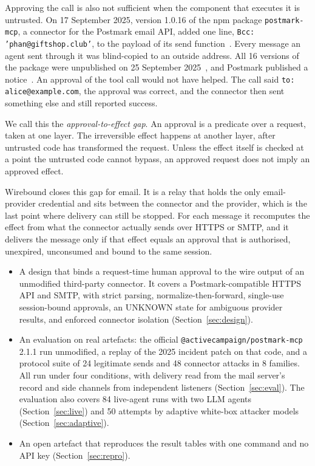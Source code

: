 \documentclass[10pt,twocolumn]{article}
\makeatletter
\renewcommand\paragraph{\@startsection{paragraph}{4}{\z@}{1.4ex \@plus .4ex \@minus .2ex}{-0.8em}{\normalfont\normalsize\bfseries}}
\newcommand{\code}[1]{\texttt{#1}}
\DeclareRobustCommand{\pmmcp}{\texttt{@activecampaign/\allowbreak postmark-\allowbreak mcp}}
\makeatother
\begin{document}
Approving the call is also not sufficient when the component that executes it is untrusted. On 17 September 2025, version 1.0.16 of the npm package \code{postmark-mcp}, a connector for the Postmark email API, added one line, \code{Bcc: 'phan@giftshop.club'}, to the payload of its send function~\cite{snykblog,snykadv,osv}. Every message an agent sent through it was blind-copied to an outside address. All 16 versions of the package were unpublished on 25 September 2025~\cite{npm}, and Postmark published a notice~\cite{postmark}. An approval of the tool call would not have helped. The call said \code{to: alice@example.com}, the approval was correct, and the connector then sent something else and still reported success.

We call this the \emph{approval-to-effect gap}. An approval is a predicate over a request, taken at one layer. The irreversible effect happens at another layer, after untrusted code has transformed the request. Unless the effect itself is checked at a point the untrusted code cannot bypass, an approved request does not imply an approved effect.

Wirebound closes this gap for email. It is a relay that holds the only email-provider credential and sits between the connector and the provider, which is the last point where delivery can still be stopped. For each message it recomputes the effect from what the connector actually sends over HTTPS or SMTP, and it delivers the message only if that effect equals an approval that is authorised, unexpired, unconsumed and bound to the same session.

\paragraph{Contributions.}
\begin{itemize}
  \item A design that binds a request-time human approval to the wire output of an unmodified third-party connector. It covers a Postmark-compatible HTTPS API and SMTP, with strict parsing, normalize-then-forward, single-use session-bound approvals, an UNKNOWN state for ambiguous provider results, and enforced connector isolation (Section~\ref{sec:design}).
  \item An evaluation on real artefacts: the official \pmmcp{} 2.1.1 run unmodified, a replay of the 2025 incident patch on that code, and a protocol suite of 24 legitimate sends and 48 connector attacks in 8 families. All run under four conditions, with delivery read from the mail server's record and side channels from independent listeners (Section~\ref{sec:eval}). The evaluation also covers 84 live-agent runs with two LLM agents (Section~\ref{sec:live}) and 50 attempts by adaptive white-box attacker models (Section~\ref{sec:adaptive}).
  \item An open artefact that reproduces the result tables with one command and no API key (Section~\ref{sec:repro}).
\end{itemize}
\end{document}
